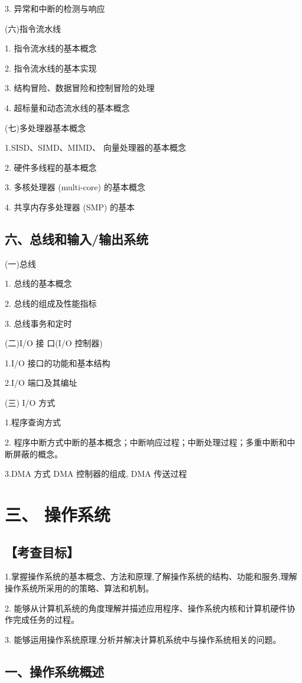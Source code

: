 \documentclass[10pt]{article}
\begin{document}
3. 异常和中断的检测与响应

(六)指令流水线

1. 指令流水线的基本概念

2. 指令流水线的基本实现

3. 结构冒险、数据冒险和控制冒险的处理

4. 超标量和动态流水线的基本概念

{\color{red} (七)多处理器基本概念

1.SISD、SIMD、MIMD、 向量处理器的基本概念

2. 硬件多线程的基本概念

3. 多核处理器 (multi-core) 的基本概念

4. 共享内存多处理器 (SMP) 的基本}

\subsection*{六、总线和输入/输出系统}

(一)总线

1. 总线的基本概念 

2. 总线的组成及性能指标 

{\color{red} 3. 总线事务和定时 

(二)I/O 接 口(I/O 控制器) 

1.I/O 接口的功能和基本结构 

2.I/O 端口及其编址 
}
(三) I/O 方式 

1.程序查询方式 

2. 程序中断方式中断的基本概念；中断响应过程；中断处理过程；多重中断和中断屏蔽的概念。 

3.DMA 方式 DMA 控制器的组成, DMA 传送过程

\section*{三、 操作系统}

\subsection*{【考查目标】}

1.掌握操作系统的基本概念、方法和原理,了解操作系统的结构、功能和服务,理解操作系统所采用的的策略、算法和机制。

2. 能够从计算机系统的角度理解并描述应用程序、操作系统内核和计算机硬件协作完成任务的过程。

3. 能够运用操作系统原理,分析并解决计算机系统中与操作系统相关的问题。

\subsection*{一、操作系统概述}
\end{document}
